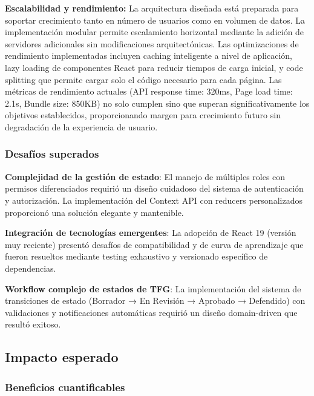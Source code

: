 \documentclass[12pt,a4paper,oneside]{report}
\begin{document}
\textbf{Escalabilidad y rendimiento:} La arquitectura diseñada está preparada para soportar crecimiento tanto en número de usuarios como en volumen de datos. La implementación modular permite escalamiento horizontal mediante la adición de servidores adicionales sin modificaciones arquitectónicas. Las optimizaciones de rendimiento implementadas incluyen caching inteligente a nivel de aplicación, lazy loading de componentes React para reducir tiempos de carga inicial, y code splitting que permite cargar solo el código necesario para cada página. Las métricas de rendimiento actuales (API response time: 320ms, Page load time: 2.1s, Bundle size: 850KB) no solo cumplen sino que superan significativamente los objetivos establecidos, proporcionando margen para crecimiento futuro sin degradación de la experiencia de usuario.

\subsubsection{Desafíos superados}\label{desafuxedos-superados}

\textbf{Complejidad de la gestión de estado}: El manejo de múltiples
roles con permisos diferenciados requirió un diseño cuidadoso del
sistema de autenticación y autorización. La implementación del Context
API con reducers personalizados proporcionó una solución elegante y
mantenible.

\textbf{Integración de tecnologías emergentes}: La adopción de React 19
(versión muy reciente) presentó desafíos de compatibilidad y de curva de aprendizaje que fueron
resueltos mediante testing exhaustivo y versionado específico de
dependencias.

\textbf{Workflow complejo de estados de TFG}: La implementación del
sistema de transiciones de estado (Borrador → En Revisión → Aprobado →
Defendido) con validaciones y notificaciones automáticas requirió un
diseño domain-driven que resultó exitoso.

\subsection{Impacto esperado}\label{impacto-esperado}

\subsubsection{Beneficios
cuantificables}\label{beneficios-cuantificables-1}
\end{document}
